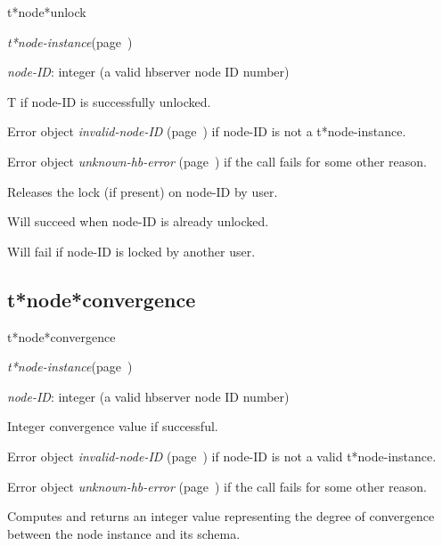 \begin{description}
\item [Name:]  t*node*unlock

\item [Class:] {\sl t*node-instance}\hfill(page~\pageref{t*node-instance})

\item [Parameters:]
\item {\sl node-ID}:  
integer (a valid hbserver node ID number)


\item [Return-value:] 
T if node-ID is successfully unlocked.

Error object {\sl invalid-node-ID} (page~\pageref{invalid-node-ID}) if node-ID is
not a t*node-instance.

Error object {\sl unknown-hb-error} (page~\pageref{unknown-hb-error}) if the call
fails for some other reason.

\item [Description:]

Releases the lock (if present) on node-ID by user.

Will succeed when node-ID is already unlocked.

Will fail if node-ID is locked by another user.


\item [Public:]



\end{description}
\horizontalline

\subsection{t*node*convergence}
\label{t*node*convergence}

\begin{description}
\item [Name:]  t*node*convergence

\item [Class:] {\sl t*node-instance}\hfill(page~\pageref{t*node-instance})

\item [Parameters:]
\item {\sl node-ID}:  
integer (a valid hbserver node ID number)


\item [Return-value:] 
Integer convergence value if successful.

Error object {\sl invalid-node-ID} (page~\pageref{invalid-node-ID}) if node-ID is not a 
valid t*node-instance.

Error object {\sl unknown-hb-error} (page~\pageref{unknown-hb-error}) if the call fails
for some other reason.

\item [Description:]

Computes and returns an integer value representing 
the degree of convergence between the node
instance and its schema.

\item [Public:]



\end{description}
\horizontalline

